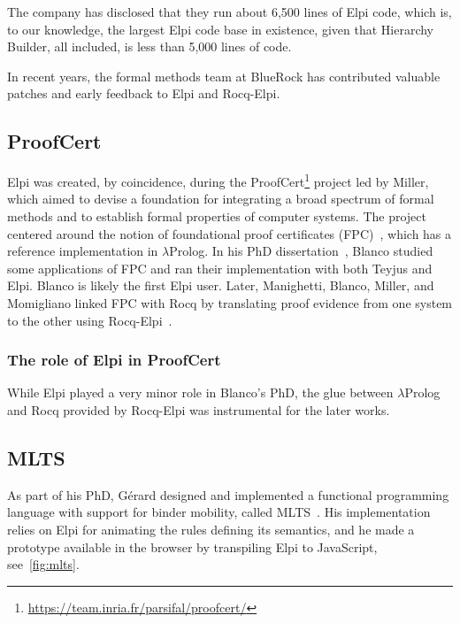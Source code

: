 \documentclass[a4paper, 11pt]{book}
\begin{document}
The company has disclosed that they run about 6,500 lines of Elpi code, which
is, to our knowledge, the largest Elpi code base in existence, given that
Hierarchy Builder, all included, is less than 5,000 lines of code.

In recent years, the formal methods team at BlueRock has contributed valuable
patches and early feedback to Elpi and Rocq-Elpi.


\subsection{ProofCert}

Elpi was created, by coincidence, during the
ProofCert\footnote{\url{https://team.inria.fr/parsifal/proofcert/}}
project led by Miller, which aimed to devise a foundation for integrating a
broad spectrum of formal methods and to establish formal properties of computer
systems. The project centered around the notion of foundational proof
certificates (FPC)~\cite{Marek_2016}, which has a reference implementation in
$\lambda$Prolog. In his PhD dissertation~\cite{rob}, Blanco studied some
applications of FPC and ran their implementation with both Teyjus and Elpi.
Blanco is likely the first Elpi user. Later, Manighetti, Blanco, Miller, and
Momigliano linked FPC with Rocq by translating proof evidence from one system
to the other using Rocq-Elpi~\cite{matteo,alberto}.

\subsubsection{The role of Elpi in ProofCert}

While Elpi played a very minor role in Blanco's PhD, the glue between
$\lambda$Prolog and Rocq provided by Rocq-Elpi was instrumental for the later
works.

\subsection{MLTS}

As part of his PhD, G\'{e}rard designed and implemented a
functional programming language with support for binder mobility, called MLTS~\cite{mlts}.
His implementation relies on Elpi for animating the rules defining its
semantics, and he made a prototype available in the browser by transpiling
Elpi to JavaScript, see~\cref{fig:mlts}.
\end{document}
